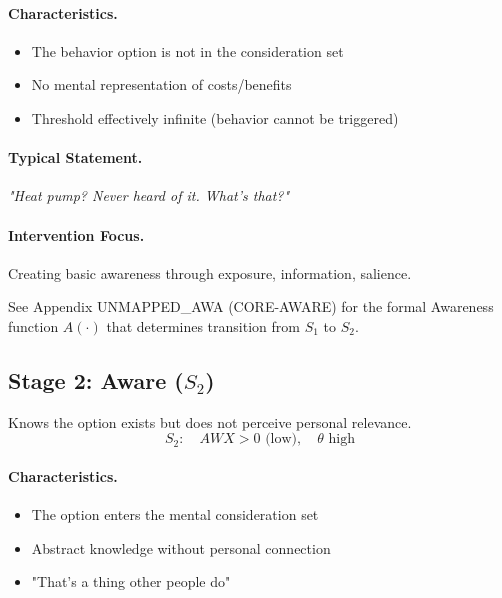 \paragraph{Characteristics.}
\begin{itemize}
    \item The behavior option is not in the consideration set
    \item No mental representation of costs/benefits
    \item Threshold effectively infinite (behavior cannot be triggered)
\end{itemize}

\paragraph{Typical Statement.}
\textit{"Heat pump? Never heard of it. What's that?"}

\paragraph{Intervention Focus.}
Creating basic awareness through exposure, information, salience.

\begin{cross-reference}
See Appendix UNMAPPED_AWA (CORE-AWARE) for the formal Awareness function $A(\cdot)$
that determines transition from $S_1$ to $S_2$.
\end{cross-reference}

\subsection{Stage 2: Aware ($S_2$)}
\label{sec:bcj-s2}

\begin{definition}
Knows the option exists but does not perceive personal relevance.
\begin{equation}
S_2: \quad AWX > 0 \text{ (low)}, \quad \theta \text{ high}
\end{equation}
\end{definition}

\paragraph{Characteristics.}
\begin{itemize}
    \item The option enters the mental consideration set
    \item Abstract knowledge without personal connection
    \item "That's a thing other people do"
\end{itemize}

